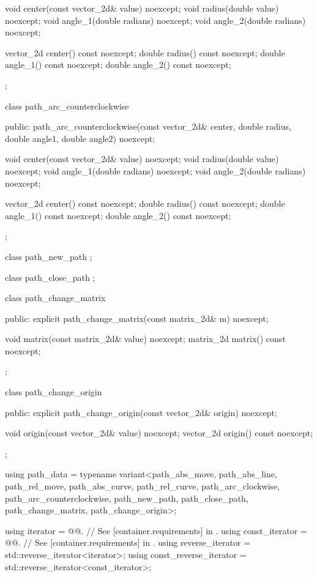 \begin{codeblock}
{{{{{{      void center(const vector_2d& value) noexcept;
      void radius(double value) noexcept;
      void angle_1(double radians) noexcept;
      void angle_2(double radians) noexcept;
      
      vector_2d center() const noexcept;
      double radius() const noexcept;
      double angle_1() const noexcept;
      double angle_2() const noexcept;
    };
    
    class path_arc_counterclockwise {
    public:
      path_arc_counterclockwise(const vector_2d& center, double radius, double angle1, double angle2) noexcept;
      
      void center(const vector_2d& value) noexcept;
      void radius(double value) noexcept;
      void angle_1(double radians) noexcept;
      void angle_2(double radians) noexcept;
      
      vector_2d center() const noexcept;
      double radius() const noexcept;
      double angle_1() const noexcept;
      double angle_2() const noexcept;
    };
    
    class path_new_path {
    };
    
    class path_close_path {
    };
    
    class path_change_matrix {
    public:
      explicit path_change_matrix(const matrix_2d& m) noexcept;
      
      void matrix(const matrix_2d& value) noexcept;
      matrix_2d matrix() const noexcept;
    };
    
    class path_change_origin {
    public:
      explicit path_change_origin(const vector_2d& origin) noexcept;
      
      void origin(const vector_2d& value) noexcept;
      vector_2d origin() const noexcept;
    };
    
    using path_data      = typename variant<path_abs_move, path_abs_line, 
      path_rel_move, path_abs_curve, path_rel_curve, path_arc_clockwise, 
      path_arc_counterclockwise, path_new_path, path_close_path, 
      path_change_matrix, path_change_origin>;
    
    using iterator       = @@. // See [container.requirements] in \cppseventeen.
    using const_iterator = @@. // See [container.requirements] in \cppseventeen.
    using reverse_iterator       = std::reverse_iterator<iterator>;
    using const_reverse_iterator = std::reverse_iterator<const_iterator>;
    
}}}}}
\end{codeblock}
